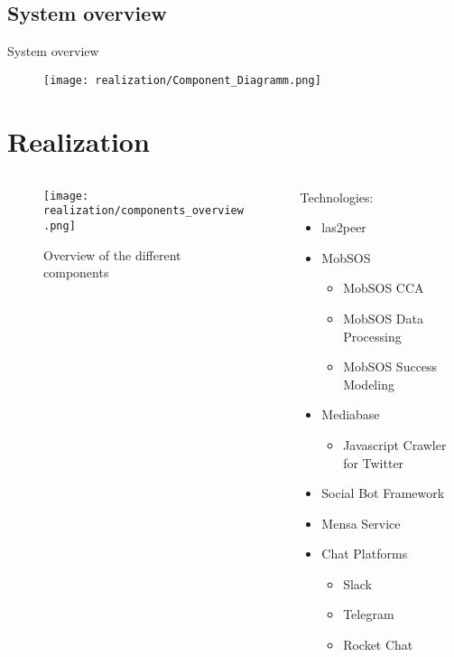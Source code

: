 \subsection{System overview}

\begin{frame}{System overview}
  \begin{figure}
    \centering
    \texttt{[image: realization/Component\_Diagramm.png]}

    \label{fig:sytsemOverview}
  \end{figure}
\end{frame}

\section{Realization}

\begin{frame}\begin{columns}
    \begin{column}[]{0.7\textwidth}
      \begin{figure}
        \centering
        \texttt{[image: realization/components\_overview.png]}
        \caption{Overview of the different components}
        \label{fig:componentsOverview}
      \end{figure}
    \end{column}
    \begin{column}[]{0.3\textwidth}
      Technologies:
      \begin{itemize}
        \item las2peer
        \item MobSOS
              \begin{itemize}
                \item MobSOS CCA
                \item MobSOS Data Processing
                \item MobSOS Success Modeling
              \end{itemize}
        \item Mediabase
              \begin{itemize}
                \item Javascript Crawler for Twitter
              \end{itemize}
        \item Social Bot Framework
        \item Mensa Service
        \item Chat Platforms
              \begin{itemize}
                \item Slack
                \item Telegram
                \item Rocket Chat
              \end{itemize}
      \end{itemize}
    \end{column}
  \end{columns}

\end{frame}

